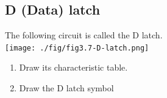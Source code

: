 \subsection{D (Data) latch \cite[Sec~3.2.2]{harris2022digital}}

\begin{definition}[D latch]
  The following circuit is called the D latch. \\
  \texttt{[image: ./fig/fig3.7-D-latch.png]} \\
  \begin{enumerate}
  \item Draw its characteristic table.
  \item Draw the D latch symbol
  \end{enumerate}
\end{definition}
\vspace{20em}

